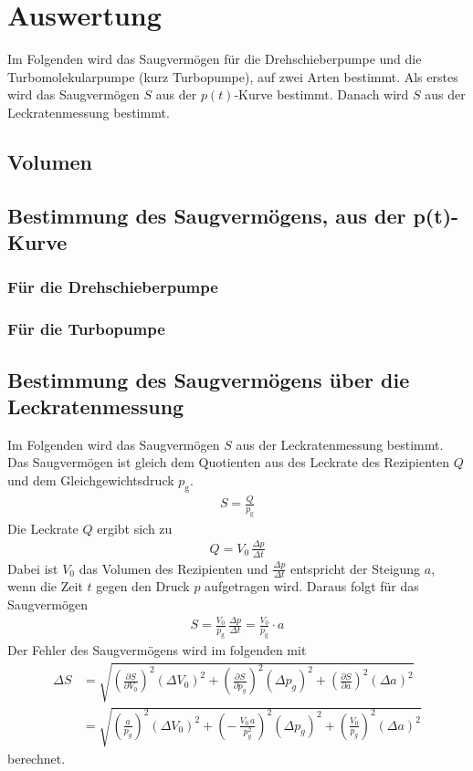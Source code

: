 \section{Auswertung}
\label{sec:Auswertung}
Im Folgenden wird das Saugvermögen für die Drehschieberpumpe und die Turbomolekularpumpe (kurz Turbopumpe), auf zwei Arten bestimmt. Als erstes wird das Saugvermögen $S$ aus der $p(t)$-Kurve bestimmt. Danach wird $S$ aus der Leckratenmessung bestimmt.


\subsection{Volumen}


\subsection{Bestimmung des Saugvermögens, aus der p(t)-Kurve}
\subsubsection{Für die Drehschieberpumpe}
\subsubsection{Für die Turbopumpe}



\subsection{Bestimmung des Saugvermögens über die Leckratenmessung}
Im Folgenden wird das Saugvermögen $S$ aus der Leckratenmessung bestimmt. Das Saugvermögen ist gleich dem Quotienten aus des Leckrate des Rezipienten $Q$ und dem Gleichgewichtsdruck $p_\text{g}$.
\begin{align}
  S = \frac{Q}{p_\text{g}}
\end{align}
Die Leckrate $Q$ ergibt sich zu
\begin{align}
  Q = V_0\, \frac{\Delta p}{\Delta t}
\end{align}
Dabei ist $V_0$ das Volumen des Rezipienten und $\frac{\Delta p}{\Delta t}$ entspricht der Steigung $a$, wenn die Zeit $t$ gegen den Druck $p$ aufgetragen wird. Daraus folgt für das Saugvermögen
\begin{align}\label{eqn:SaugLeck}
  S = \frac{V_0}{p_\text{g}}\, \frac{\Delta p}{\Delta t} = \frac{V_0}{p_\text{g}} \cdot a
\end{align}
Der Fehler des Saugvermögens wird im folgenden mit
\begin{align*}
  \Delta S &= \sqrt{ \left(\frac{\partial S}{\partial V_0} \right)^2 (\Delta V_0)^2 + \left(\frac{\partial S}{\partial p_g} \right)^2 (\Delta p_g)^2 + \left(\frac{\partial S}{\partial a} \right)^2 (\Delta a)^2 } \\
  &= \sqrt{ \left(\frac{a}{p_g} \right)^2 (\Delta V_0)^2 + \left(-\,\frac{V_0\,a}{p_g^2} \right)^2 (\Delta p_g)^2 + \left(\frac{V_0}{p_g} \right)^2 (\Delta a)^2 }
\end{align*}
berechnet.


